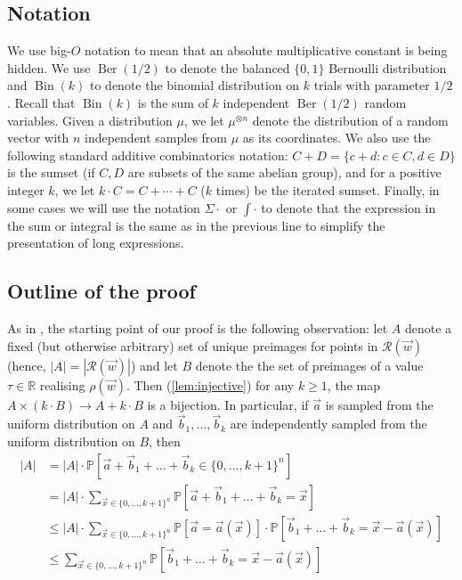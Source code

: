 \documentclass[11pt]{article}
\numberwithin{equation}{section}
\theoremstyle{definition}
\theoremstyle{remark}
\newcommand{\mb}{\mathbb}
\newcommand{\mc}{\mathcal}
\newcommand{\on}{\operatorname}
\begin{document}
\subsection{Notation}\label{sub:notation}
We use big-$O$ notation to mean that an absolute multiplicative constant is being hidden. We use $\on{Ber}(1/2)$ to denote the balanced $\{0,1\}$ Bernoulli distribution and $\on{Bin}(k)$ to denote the binomial distribution on $k$ trials with parameter $1/2$. Recall that $\on{Bin}(k)$ is the sum of $k$ independent $\on{Ber}(1/2)$ random variables. Given a distribution $\mu$, we let $\mu^{\otimes n}$ denote the distribution of a random vector with $n$ independent samples from $\mu$ as its coordinates. We also use the following standard additive combinatorics notation: $C+D = \{c+d: c\in C,d\in D\}$ is the sumset (if $C,D$ are subsets of the same abelian group), and for a positive integer $k$, we let $k\cdot C = C+\cdots+C$ ($k$ times) be the iterated sumset. Finally, in some cases we will use the notation $\Sigma\cdot$ or $\int\cdot$ to denote that the expression in the sum or integral is the same as in the previous line to simplify the presentation of long expressions.

\subsection{Outline of the proof}
\label{sub:outline}
As in \cite{NPSW20}, the starting point of our proof is the following observation: let $A$ denote a fixed (but otherwise arbitrary) set of unique preimages for points in $\mc{R}(\vec{w})$ (hence, $|A| = |\mc{R}(\vec{w})|$) and let $B$ denote the the set of preimages of a value $\tau \in \mb{R}$ realising $\rho(\vec{w})$. Then (\cref{lem:injective}) for any $k\geq 1$, the map $A \times (k\cdot B) \to A + k\cdot B$ is a bijection. In particular, if $\vec{a}$ is sampled from the uniform distribution on $A$ and $\vec{b}_1,\dots, \vec{b}_k$ are independently sampled from the uniform distribution on $B$, then
\begin{align*}
    |A| &= |A| \cdot \mb{P}[\vec{a} + \vec{b}_1 + \dots  + \vec{b}_k \in \{0,\dots, k+1\}^{n}]\\
        &= |A| \cdot \sum_{\vec{x} \in \{0,\dots, k+1\}^{n}}\mb{P}[\vec{a} + \vec{b}_1 + \dots + \vec{b}_k = \vec{x}]\\
        &\leq |A| \cdot \sum_{\vec{x} \in \{0,\dots, k+1\}^{n}} \mb{P}[\vec{a} = \vec{a}(\vec{x})] \cdot \mb{P}[\vec{b}_1 + \dots + \vec{b}_k = \vec{x} - \vec{a}(\vec{x})]\\
        &\leq \sum_{\vec{x} \in \{0,\dots, k+1\}^{n}}\mb{P}[\vec{b}_1 + \dots + \vec{b}_k = \vec{x} - \vec{a}(\vec{x})] 
\end{align*}
\end{document}

